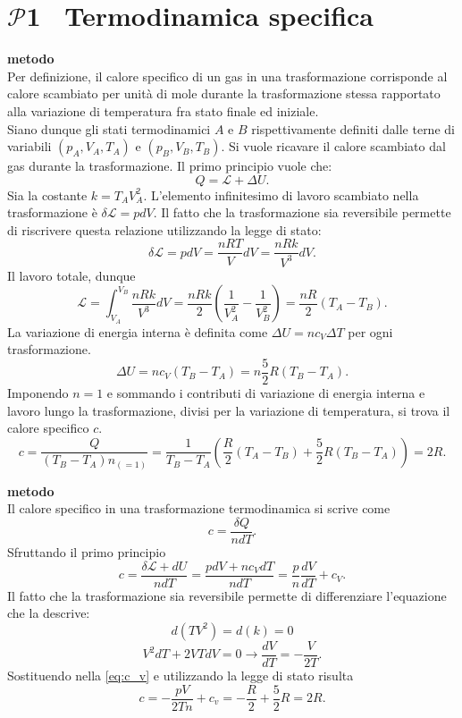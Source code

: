 \documentclass[a4paper,12pt]{article}
\newcommand{\problemtitle}[1]{
  \noindent
  \textbf{\Large #1}\hspace{0.5em}
  \raisebox{0.6ex}{\rule{\linewidth - \widthof{\textbf{\Large #1}} - 0.6em}{0.4pt}}%
}
\begin{document}
\section*{\problemtitle{$\mathcal{P}${\small{1}} \ Termodinamica specifica }}


\textbf{ metodo} \\
Per definizione, il calore specifico di un gas in una trasformazione corrisponde al calore scambiato per unità di mole durante la trasformazione stessa rapportato alla variazione di temperatura fra stato finale ed iniziale. \\
Siano dunque gli stati termodinamici $A$ e $B$ rispettivamente definiti dalle terne di variabili $(p_A, V_A, T_A)$ e $(p_B, V_B, T_B)$. Si vuole ricavare il calore scambiato dal gas durante la trasformazione. Il primo principio vuole che: 
\[
Q = \mathcal{L} + \Delta U. \tag{1.0} \label{eq:primo_principio}
\]
Sia la costante $k = T_AV_A^2$. L'elemento infinitesimo di lavoro scambiato nella trasformazione è $\delta \mathcal{L} = pdV$. Il fatto che la trasformazione sia reversibile permette di riscrivere questa relazione utilizzando la legge di stato:
\[
\delta \mathcal{L} = pdV = \frac{nRT}{V}dV = \frac{nRk}{V^3}dV. \tag{1.1}
\] 
Il lavoro totale, dunque 
\[
\mathcal{L} = \int_{V_A}^{V_B}  \frac{nRk}{V^3}dV = \frac{nRk}{2}\left(\frac{1}{V_A^2} - \frac{1}{V_B^2}\right) = \frac{nR}{2}(T_A-T_B). \tag{1.2}
\]
La variazione di energia interna è definita come $\Delta U = nc_V \Delta T$ per ogni trasformazione. 
\[
\Delta U = nc_V (T_B-T_A) = n\frac{5}{2}R(T_B-T_A). \tag{1.3}
\]
Imponendo $n=1$ e sommando i contributi di variazione di energia interna e lavoro lungo la trasformazione, divisi per la variazione di temperatura, si trova il calore specifico $c$.
\[
c = \frac{Q}{(T_B-T_A)n_{(=1)}} = \frac{1}{T_B-T_A}\left(\frac{R}{2}(T_A-T_B) + \frac{5}{2}R(T_B-T_A)\right) = 2R. \tag{1.4} \label{eq:2R}
\]

\noindent
\textbf{ metodo} \\
Il calore specifico in una trasformazione termodinamica si scrive come
\[
c = \frac{\delta Q}{n dT}. \tag{1.5}
\]
Sfruttando il primo principio
\[
c = \frac{\delta \mathcal{L} + dU}{n dT} = \frac{pdV + nc_VdT}{n dT} = \frac{p}{n}\frac{dV}{dT} + c_V. \tag{1.6} \label{eq:c_v}
\]
Il fatto che la trasformazione sia reversibile permette di differenziare l'equazione che la descrive:
\[
d(TV^2) = d(k) = 0 \tag{1.7}
\]
\[
V^2dT + 2VTdV = 0 \rightarrow \frac{dV}{dT} = -\frac{V}{2T}. \tag{1.8}
\]
Sostituendo nella \ref{eq:c_v} e utilizzando la legge di stato risulta
\[
c = -\frac{pV}{2Tn} + c_v = -\frac{R}{2} + \frac{5}{2}R = 2R. \tag{1.9}
\]
\end{document}
